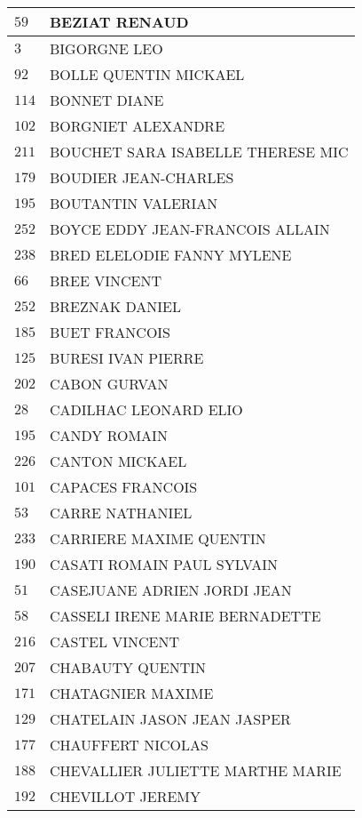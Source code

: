 \begin{xltabular}{\linewidth}{|l|X|}
    \hline
    $59$ & BEZIAT RENAUD \\
    \hline
    $3$ & BIGORGNE LEO \\
    \hline
    $92$ & BOLLE QUENTIN MICKAEL \\
    \hline
    $114$ & BONNET DIANE \\
    \hline
    $102$ & BORGNIET ALEXANDRE \\
    \hline
    $211$ & BOUCHET SARA ISABELLE THERESE MIC \\
    \hline
    $179$ & BOUDIER JEAN-CHARLES \\
    \hline
    $195$ & BOUTANTIN VALERIAN \\
    \hline
    $252$ & BOYCE EDDY JEAN-FRANCOIS ALLAIN \\
    \hline
    $238$ & BRED ELELODIE FANNY MYLENE \\
    \hline
    $66$ & BREE VINCENT \\
    \hline
    $252$ & BREZNAK DANIEL \\
    \hline
    $185$ & BUET FRANCOIS \\
    \hline
    $125$ & BURESI IVAN PIERRE \\
    \hline
    $202$ & CABON GURVAN \\
    \hline
    $28$ & CADILHAC LEONARD ELIO \\
    \hline
    $195$ & CANDY ROMAIN \\
    \hline
    $226$ & CANTON MICKAEL \\
    \hline
    $101$ & CAPACES FRANCOIS \\
    \hline
    $53$ & CARRE NATHANIEL \\
    \hline
    $233$ & CARRIERE MAXIME QUENTIN \\
    \hline
    $190$ & CASATI ROMAIN PAUL SYLVAIN \\
    \hline
    $51$ & CASEJUANE ADRIEN JORDI JEAN \\
    \hline
    $58$ & CASSELI IRENE MARIE BERNADETTE \\
    \hline
    $216$ & CASTEL VINCENT \\
    \hline
    $207$ & CHABAUTY QUENTIN \\
    \hline
    $171$ & CHATAGNIER MAXIME \\
    \hline
    $129$ & CHATELAIN JASON JEAN JASPER \\
    \hline
    $177$ & CHAUFFERT NICOLAS \\
    \hline
    $188$ & CHEVALLIER JULIETTE MARTHE MARIE \\
    \hline
    $192$ & CHEVILLOT JEREMY \\

\end{xltabular}
